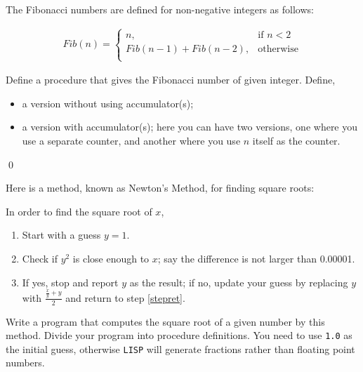 \documentclass[a4paper,11pt]{article}
\begin{document}
\begin{uexercise}

The Fibonacci numbers are defined for non-negative integers as follows:

\begin{align}
Fib(n) =  
\begin{cases}
n, & \text{if }n < 2 \\
Fib(n - 1) + Fib(n-2), & \text{otherwise} \\
\end{cases}
\end{align}

Define a procedure that gives the Fibonacci number of given integer. Define,

\begin{itemize}
\item a version without using accumulator(s);
\item a version with accumulator(s); here you can have two versions, one where you use a separate counter, and another where you use $n$ itself as the counter.
\end{itemize}

\qed
\end{uexercise}

\begin{uexercise}

Here is a method, known as Newton's Method, for finding square roots:  

In order to find the square root of $x$,

\begin{enumerate}
\item Start with a guess $y=1$.
\item\label{stepret} Check if $y^2$ is close enough to $x$; say the difference is not larger than 0.00001.
\item If yes, stop and report $y$ as the result; if no, update your guess by replacing $y$ with $\frac{\frac{x}{y} + y}{2}$ and return to step \ref{stepret}. 
\end{enumerate}

Write a program that computes the square root of a given number by this method. Divide your program into procedure definitions. You need to use \Verb+1.0+ as the initial guess, otherwise \Verb+LISP+ will generate fractions rather than floating point numbers. 

\end{uexercise}

\noindent\hrulefill
\end{document}
